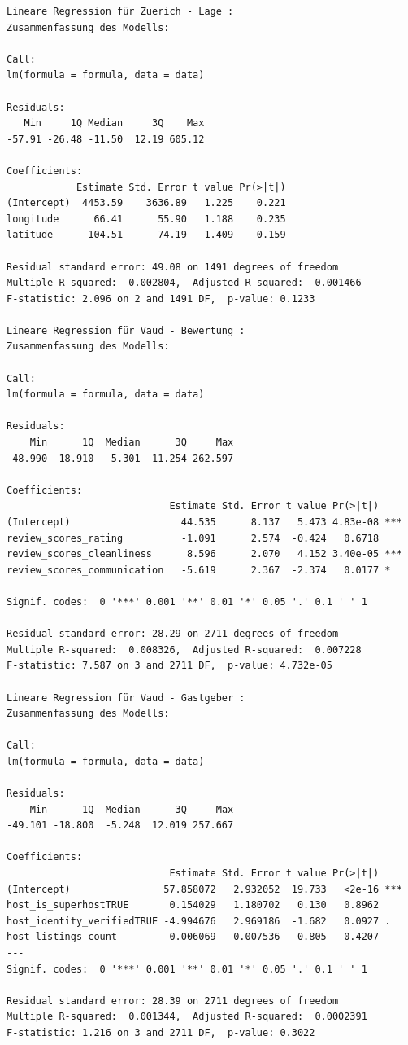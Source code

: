 \documentclass[
  journal,
]{IEEEtran}%
\begin{document}
\begin{verbatim}
Lineare Regression für Zuerich - Lage :
Zusammenfassung des Modells:

Call:
lm(formula = formula, data = data)

Residuals:
   Min     1Q Median     3Q    Max 
-57.91 -26.48 -11.50  12.19 605.12 

Coefficients:
            Estimate Std. Error t value Pr(>|t|)
(Intercept)  4453.59    3636.89   1.225    0.221
longitude      66.41      55.90   1.188    0.235
latitude     -104.51      74.19  -1.409    0.159

Residual standard error: 49.08 on 1491 degrees of freedom
Multiple R-squared:  0.002804,  Adjusted R-squared:  0.001466 
F-statistic: 2.096 on 2 and 1491 DF,  p-value: 0.1233

Lineare Regression für Vaud - Bewertung :
Zusammenfassung des Modells:

Call:
lm(formula = formula, data = data)

Residuals:
    Min      1Q  Median      3Q     Max 
-48.990 -18.910  -5.301  11.254 262.597 

Coefficients:
                            Estimate Std. Error t value Pr(>|t|)    
(Intercept)                   44.535      8.137   5.473 4.83e-08 ***
review_scores_rating          -1.091      2.574  -0.424   0.6718    
review_scores_cleanliness      8.596      2.070   4.152 3.40e-05 ***
review_scores_communication   -5.619      2.367  -2.374   0.0177 *  
---
Signif. codes:  0 '***' 0.001 '**' 0.01 '*' 0.05 '.' 0.1 ' ' 1

Residual standard error: 28.29 on 2711 degrees of freedom
Multiple R-squared:  0.008326,  Adjusted R-squared:  0.007228 
F-statistic: 7.587 on 3 and 2711 DF,  p-value: 4.732e-05

Lineare Regression für Vaud - Gastgeber :
Zusammenfassung des Modells:

Call:
lm(formula = formula, data = data)

Residuals:
    Min      1Q  Median      3Q     Max 
-49.101 -18.800  -5.248  12.019 257.667 

Coefficients:
                            Estimate Std. Error t value Pr(>|t|)    
(Intercept)                57.858072   2.932052  19.733   <2e-16 ***
host_is_superhostTRUE       0.154029   1.180702   0.130   0.8962    
host_identity_verifiedTRUE -4.994676   2.969186  -1.682   0.0927 .  
host_listings_count        -0.006069   0.007536  -0.805   0.4207    
---
Signif. codes:  0 '***' 0.001 '**' 0.01 '*' 0.05 '.' 0.1 ' ' 1

Residual standard error: 28.39 on 2711 degrees of freedom
Multiple R-squared:  0.001344,  Adjusted R-squared:  0.0002391 
F-statistic: 1.216 on 3 and 2711 DF,  p-value: 0.3022


\end{verbatim}
\end{document}
